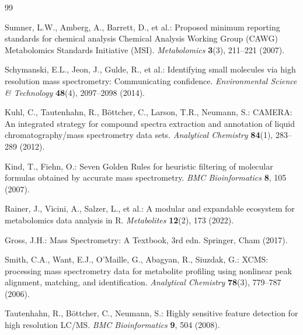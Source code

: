 \documentclass[11pt,twoside,openright]{book}
\begin{document}

\begin{thebibliography}{99}
\small

Sumner, L.W., Amberg, A., Barrett, D., et al.: Proposed minimum reporting standards for chemical analysis Chemical Analysis Working Group (CAWG) Metabolomics Standards Initiative (MSI).
\textit{Metabolomics} \textbf{3}(3), 211--221 (2007).

Schymanski, E.L., Jeon, J., Gulde, R., et al.: Identifying small molecules via high resolution mass spectrometry: Communicating confidence.
\textit{Environmental Science \& Technology} \textbf{48}(4), 2097--2098 (2014).

Kuhl, C., Tautenhahn, R., B{\"o}ttcher, C., Larson, T.R., Neumann, S.: CAMERA: An integrated strategy for compound spectra extraction and annotation of liquid chromatography/mass spectrometry data sets.
\textit{Analytical Chemistry} \textbf{84}(1), 283--289 (2012).

Kind, T., Fiehn, O.: Seven Golden Rules for heuristic filtering of molecular formulas obtained by accurate mass spectrometry.
\textit{BMC Bioinformatics} \textbf{8}, 105 (2007).

Rainer, J., Vicini, A., Salzer, L., et al.: A modular and expandable ecosystem for metabolomics data analysis in R.
\textit{Metabolites} \textbf{12}(2), 173 (2022).

Gross, J.H.: Mass Spectrometry: A Textbook, 3rd edn.
Springer, Cham (2017).

Smith, C.A., Want, E.J., O'Maille, G., Abagyan, R., Siuzdak, G.: XCMS: processing mass spectrometry data for metabolite profiling using nonlinear peak alignment, matching, and identification.
\textit{Analytical Chemistry} \textbf{78}(3), 779--787 (2006).

Tautenhahn, R., B{\"o}ttcher, C., Neumann, S.: Highly sensitive feature detection for high resolution LC/MS.
\textit{BMC Bioinformatics} \textbf{9}, 504 (2008).


\end{thebibliography}
\end{document}
